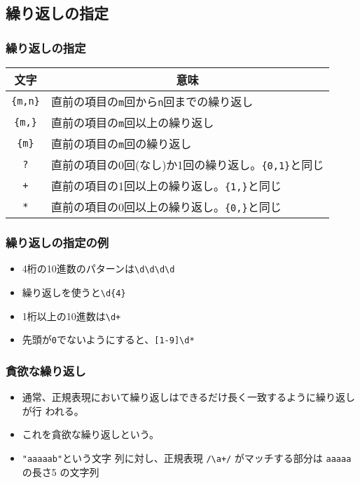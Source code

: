 \subsection{繰り返しの指定}
\begin{frame}[containsverbatim]
 \frametitle{繰り返しの指定}
\begin{center}
 \begin{tabular}{|c|m{}|}\hline
  文字&\multicolumn{1}{c|}{意味}\\\hline
\Verb+{m,n}+&直前の項目の\texttt{m}回から\texttt{n}回までの繰り返し\\\hline
\Verb+{m,}+&直前の項目の\texttt{m}回以上の繰り返し\\\hline
\Verb+{m}+&直前の項目の\texttt{m}回の繰り返し\\\hline
\Verb+?+&直前の項目の0回(なし)か1回の繰り返し。\Verb+{0,1}+と同じ\\\hline
\Verb-+-&直前の項目の1回以上の繰り返し。\Verb+{1,}+と同じ\\\hline
\Verb+*+&直前の項目の0回以上の繰り返し。\Verb+{0,}+と同じ\\\hline
\end{tabular}
\end{center}
\end{frame}
\begin{frame}[containsverbatim]
 \frametitle{繰り返しの指定の例}
\begin{itemize}
 \item 4桁の10進数のパターンは\Verb+\d\d\d\d+
 \item 繰り返しを使うと\Verb+\d{4}+
 \item 1桁以上の10進数は\Verb-\d+-
 \item 先頭が\texttt{0}でないようにすると、\Verb+[1-9]\d*+
\end{itemize}
\end{frame}
\begin{frame}[containsverbatim]
 \frametitle{貪欲な繰り返し}
\begin{itemize}
 \item 通常、正規表現において繰り返しはできるだけ長く一致するように繰り返しが行
われる。
 \item これを貪欲な繰り返しという。
 \item \Verb+"aaaaab"+という文字
列に対し、正規表現 \Verb-/\a+/- がマッチする部分は \Verb+aaaaa+ の長さ5
の文字列
\end{itemize}
\end{frame}

